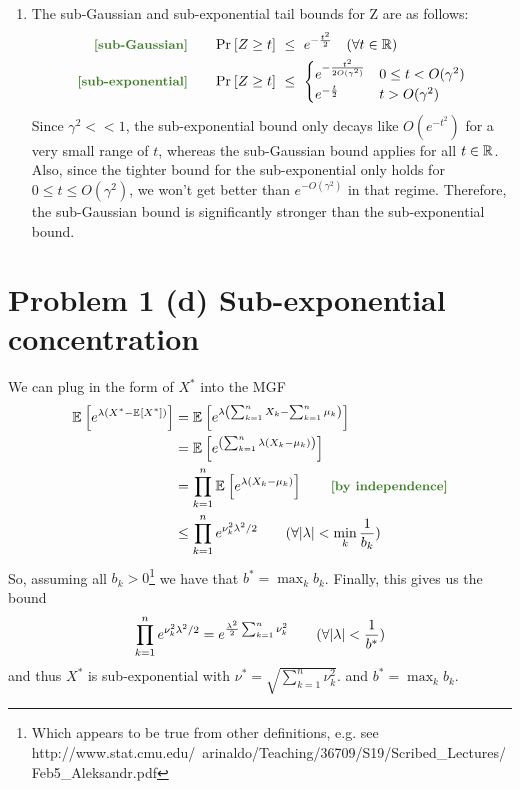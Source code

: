 \documentclass[11pt]{article}
\newcommand{\1}{\mathbb{I}} %
\begin{document}
\begin{enumerate}
	
	\item The sub-Gaussian and sub-exponential tail bounds for Z are as follows:
	\begin{align}
		\mtgreen{[sub-Gaussian]}\qquad 
		\Prob{Z \geq t} 
			&~\leq~ e^{- \frac{t^2}{2} } \quad (\forall t \in \R) \label{eq:1c-sg} \\
		\mtgreen{[sub-exponential]}\qquad
		\Prob{Z \geq t}
			&~\leq~ \begin{cases}
				e^{-\frac{t^2}{2 O(\gamma^2)}} & 0 \leq t < O(\gamma^2) \\
				e^{-\frac{t}{2}} & t > O(\gamma^2)
			\end{cases}
	\end{align}
	Since $\gamma^2 << 1$, the sub-exponential bound only decays like $O(e^{-t^2})$ for a very small range of $t$, whereas the sub-Gaussian bound applies for all $t \in \mathbb{R}$. Also, since the tighter bound for the sub-exponential only holds for $0 \leq t \leq O(\gamma^2)$, we won't get better than $e^{-O(\gamma^2)}$ in that regime. Therefore, the sub-Gaussian bound is significantly stronger than the sub-exponential bound.
\end{enumerate}



\clearpage
\section*{Problem 1 (d) Sub-exponential concentration}

We can plug in the form of $X^*$ into the MGF
\begin{align}
	\E{ e^{\lambda \lr{ X^* - \E{X^*}  }  } }
		&= \E{  e^{\lambda\lr{ \sum_{k=1}^{n} X_k - \sum_{k=1}^{n} \mu_k }  } } \\
		&=  \E{  e^{\lr{ \sum_{k=1}^{n} \lambda (X_k -  \mu_k )}  }} \\
		&= \prod_{k=1}^{n} \E{ e^{ \lambda (X_k - \mu_k)  }} \qquad \mtgreen{[by independence]} \\
		&\leq \prod_{k=1}^{n} e^{\nu_k^2\lambda^2 / 2} \qquad (\forall |\lambda| < \min_k \inv{b_k}) 
\end{align}
So, assuming all $b_k > 0$\footnote{Which appears to be true from other definitions, e.g. see http://www.stat.cmu.edu/~arinaldo/Teaching/36709/S19/Scribed\_Lectures/Feb5\_Aleksandr.pdf} we have that  $b^* = \max_k {b_k}$. Finally, this gives us the bound
\begin{align}
	\prod_{k=1}^n e^{\nu_k^2 \lambda^2 / 2}
	= e^{  \frac{\lambda^2}{2}  \sum_{k=1}^{n} \nu_k^2    }
	 \qquad (\forall |\lambda| < \frac{1}{b^*})
\end{align}
and thus $X^*$ is sub-exponential with $\nu^* = \sqrt{ \sum_{k=1}^{n} \nu_k^2    }$. and $b^* = \max_k {b_k}$. 
\end{document}
